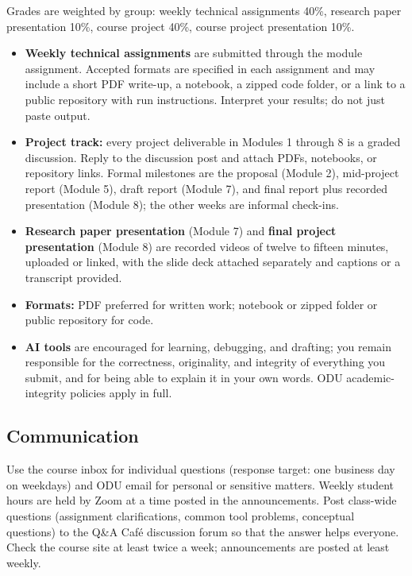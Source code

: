 \documentclass[11pt]{article}
\theoremstyle{remark}
\begin{document}
Grades are weighted by group: weekly technical assignments 40\%, research paper presentation 10\%, course project 40\%, course project presentation 10\%.
\begin{itemize}[leftmargin=1.5em,itemsep=2pt]
  \item \textbf{Weekly technical assignments} are submitted through the module assignment. Accepted formats are specified in each assignment and may include a short PDF write-up, a notebook, a zipped code folder, or a link to a public repository with run instructions. Interpret your results; do not just paste output.
  \item \textbf{Project track:} every project deliverable in Modules 1 through 8 is a graded discussion. Reply to the discussion post and attach PDFs, notebooks, or repository links. Formal milestones are the proposal (Module 2), mid-project report (Module 5), draft report (Module 7), and final report plus recorded presentation (Module 8); the other weeks are informal check-ins.
  \item \textbf{Research paper presentation} (Module 7) and \textbf{final project presentation} (Module 8) are recorded videos of twelve to fifteen minutes, uploaded or linked, with the slide deck attached separately and captions or a transcript provided.
  \item \textbf{Formats:} PDF preferred for written work; notebook or zipped folder or public repository for code.
  \item \textbf{AI tools} are encouraged for learning, debugging, and drafting; you remain responsible for the correctness, originality, and integrity of everything you submit, and for being able to explain it in your own words. ODU academic-integrity policies apply in full.
\end{itemize}

\subsection{Communication}

Use the course inbox for individual questions (response target: one business day on weekdays) and ODU email for personal or sensitive matters. Weekly student hours are held by Zoom at a time posted in the announcements. Post class-wide questions (assignment clarifications, common tool problems, conceptual questions) to the Q\&A Caf\'e discussion forum so that the answer helps everyone. Check the course site at least twice a week; announcements are posted at least weekly.
\end{document}

